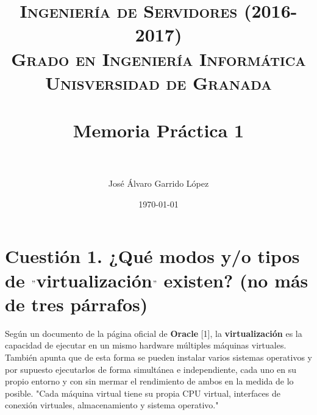 


\title{	
\normalfont \normalsize 
\textsc{\textbf{Ingeniería de Servidores (2016-2017)} \\ Grado en Ingeniería Informática \\ Unisversidad de Granada} \\ [25pt] %
\horrule{0.5pt} \\[0.4cm] %
\huge Memoria Práctica 1 \\ %
\horrule{2pt} \\[0.5cm] %
}

\author{José Álvaro Garrido López} %

\date{\normalsize\today} %




\maketitle %

\newpage %

\tableofcontents %

\listoffigures

\listoftables

\newpage

\newpage

\section{Cuestión 1. ¿Qué modos y/o tipos de $"$virtualización$"$ existen? (no más de tres párrafos)}

Según un documento de la página oficial de \textbf{Oracle} [1],
la \textbf{virtualización} es la capacidad de ejecutar en un mismo hardware múltiples máquinas virtuales.
También apunta que de esta forma se pueden instalar varios sistemas operativos y por supuesto ejecutarlos de forma simultánea e independiente, cada uno en su propio entorno y con sin mermar el rendimiento de ambos en la medida de lo posible.
"Cada máquina virtual tiene su propia CPU virtual, interfaces de conexión virtuales, almacenamiento y sistema operativo."

